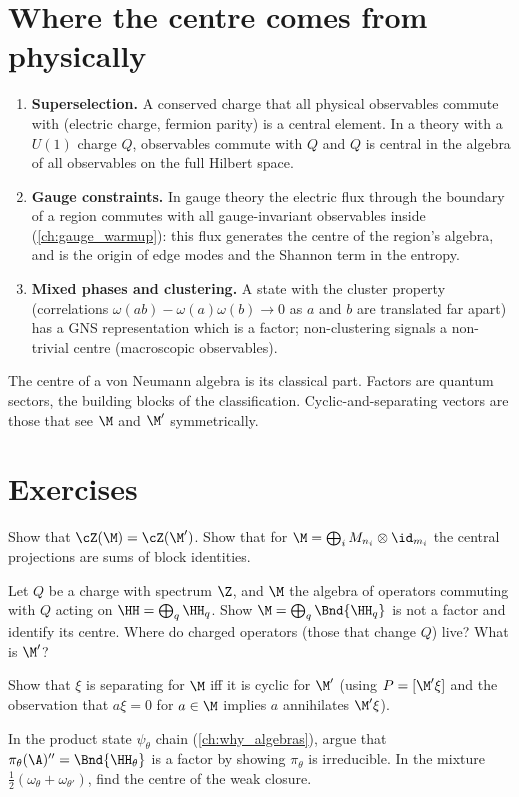 \section{Where the centre comes from physically}

\begin{enumerate}
\item \textbf{Superselection.} A conserved charge that all physical observables commute with (electric charge, fermion parity) is a central element. In a theory with a $U(1)$ charge $Q$, observables commute with $Q$ and $Q$ is central in the algebra of all observables on the full Hilbert space.
\item \textbf{Gauge constraints.} In gauge theory the electric flux through the boundary of a region commutes with all gauge-invariant observables inside (\cref{ch:gauge_warmup}): this flux generates the centre of the region's algebra, and is the origin of edge modes and the Shannon term in the entropy.
\item \textbf{Mixed phases and clustering.} A state with the cluster property (correlations $\omega(ab)-\omega(a)\omega(b)\to0$ as $a$ and $b$ are translated far apart) has a GNS representation which is a factor; non-clustering signals a non-trivial centre (macroscopic observables).
\end{enumerate}

\begin{keyidea}
The centre of a von Neumann algebra is its classical part. Factors are quantum sectors, the building blocks of the classification. Cyclic-and-separating vectors are those that see $\M$ and $\M'$ symmetrically.
\end{keyidea}

\section*{Exercises}
\begin{exercise}
Show that $\cZ(\M)=\cZ(\M')$. Show that for $\M=\bigoplus_iM_{n_i}\otimes\id_{m_i}$ the central projections are sums of block identities.
\end{exercise}
\begin{exercise}
Let $Q$ be a charge with spectrum $\Z$, and $\M$ the algebra of operators commuting with $Q$ acting on $\HH=\bigoplus_q\HH_q$. Show $\M=\bigoplus_q\Bnd{\HH_q}$ is not a factor and identify its centre. Where do charged operators (those that change $Q$) live? What is $\M'$?
\end{exercise}
\begin{exercise}
Show that $\xi$ is separating for $\M$ iff it is cyclic for $\M'$ (using $P=[\M'\xi]$ and the observation that $a\xi=0$ for $a\in\M$ implies $a$ annihilates $\M'\xi$).
\end{exercise}
\begin{exercise}
In the product state $\psi_\theta$ chain (\cref{ch:why_algebras}), argue that $\pi_\theta(\A)''=\Bnd{\HH_\theta}$ is a factor by showing $\pi_\theta$ is irreducible. In the mixture $\tfrac12(\omega_\theta+\omega_{\theta'})$, find the centre of the weak closure.
\end{exercise}
